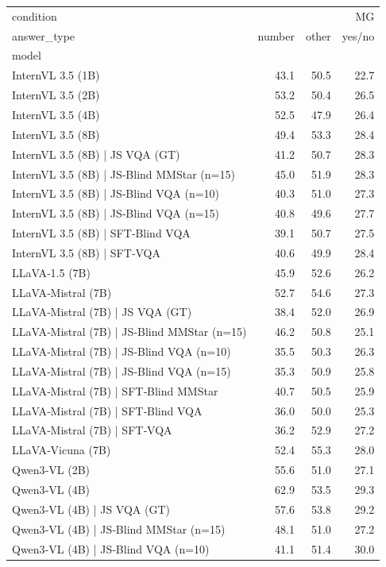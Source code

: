 \begin{tabular}{lrrr}
\toprule
condition & \multicolumn{3}{r}{MG} \\
answer_type & number & other & yes/no \\
model &  &  &  \\
\midrule
InternVL 3.5 (1B) & 43.1 & 50.5 & 22.7 \\
InternVL 3.5 (2B) & 53.2 & 50.4 & 26.5 \\
InternVL 3.5 (4B) & 52.5 & 47.9 & 26.4 \\
InternVL 3.5 (8B) & 49.4 & 53.3 & 28.4 \\
InternVL 3.5 (8B) | JS VQA (GT) & 41.2 & 50.7 & 28.3 \\
InternVL 3.5 (8B) | JS‑Blind MMStar (n=15) & 45.0 & 51.9 & 28.3 \\
InternVL 3.5 (8B) | JS‑Blind VQA (n=10) & 40.3 & 51.0 & 27.3 \\
InternVL 3.5 (8B) | JS‑Blind VQA (n=15) & 40.8 & 49.6 & 27.7 \\
InternVL 3.5 (8B) | SFT‑Blind VQA & 39.1 & 50.7 & 27.5 \\
InternVL 3.5 (8B) | SFT‑VQA & 40.6 & 49.9 & 28.4 \\
LLaVA‑1.5 (7B) & 45.9 & 52.6 & 26.2 \\
LLaVA‑Mistral (7B) & 52.7 & 54.6 & 27.3 \\
LLaVA‑Mistral (7B) | JS VQA (GT) & 38.4 & 52.0 & 26.9 \\
LLaVA‑Mistral (7B) | JS‑Blind MMStar (n=15) & 46.2 & 50.8 & 25.1 \\
LLaVA‑Mistral (7B) | JS‑Blind VQA (n=10) & 35.5 & 50.3 & 26.3 \\
LLaVA‑Mistral (7B) | JS‑Blind VQA (n=15) & 35.3 & 50.9 & 25.8 \\
LLaVA‑Mistral (7B) | SFT‑Blind MMStar & 40.7 & 50.5 & 25.9 \\
LLaVA‑Mistral (7B) | SFT‑Blind VQA & 36.0 & 50.0 & 25.3 \\
LLaVA‑Mistral (7B) | SFT‑VQA & 36.2 & 52.9 & 27.2 \\
LLaVA‑Vicuna (7B) & 52.4 & 55.3 & 28.0 \\
Qwen3‑VL (2B) & 55.6 & 51.0 & 27.1 \\
Qwen3‑VL (4B) & 62.9 & 53.5 & 29.3 \\
Qwen3‑VL (4B) | JS VQA (GT) & 57.6 & 53.8 & 29.2 \\
Qwen3‑VL (4B) | JS‑Blind MMStar (n=15) & 48.1 & 51.0 & 27.2 \\
Qwen3‑VL (4B) | JS‑Blind VQA (n=10) & 41.1 & 51.4 & 30.0 \\

\end{tabular}
